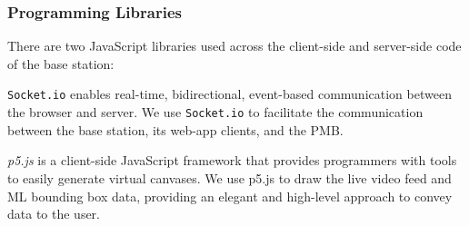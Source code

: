\subsubsection{Programming Libraries}

There are two JavaScript libraries used across the client-side and server-side code of the base station:

\texttt{Socket.io} enables real-time, bidirectional, event-based communication between the browser and server. We use \texttt{Socket.io} to facilitate the communication between the base station, its web-app clients, and the PMB. 

\textit{p5.js} is a client-side JavaScript framework that provides programmers with tools to easily generate virtual canvases. We use p5.js to draw the live video feed and ML bounding box data, providing an elegant and high-level approach to convey data to the user.
